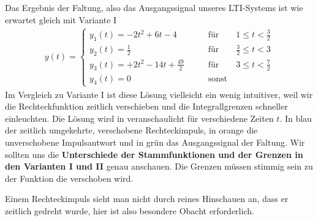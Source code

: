 \begin{Loesung}
Das Ergebnis der Faltung, also das Ausgangssignal unseres LTI-Systems ist
wie erwartet gleich mit Variante I
\begin{align}
y(t) =
\begin{cases}
  y_1(t) = -2 t^2 + 6 t - 4 &\qquad \mathrm{für} \qquad 1 \leq t < \frac{3}{2}\\
  y_2(t) = \frac{1}{2}  &\qquad \mathrm{für} \qquad \frac{3}{2} \leq t < 3\\
  y_3(t) = +2 t^2 - 14 t + \frac{49}{2} &\qquad \mathrm{für} \qquad 3 \leq t < \frac{7}{2}\\
  y_4(t)=0 &\qquad \mathrm{sonst}
\end{cases}
\end{align}
Im Vergleich zu Variante I ist diese Lösung vielleicht ein wenig
intuitiver, weil wir die Rechteckfunktion zeitlich verschieben und die
Integrallgrenzen schneller einleuchten.
%
Die Lösung wird in  veranschaulicht für verschiedene
Zeiten $t$. In blau der zeitlich umgekehrte, verschobene Rechteckimpuls, in
orange die unverschobene Impulsantwort und in grün das Ausgangssignal der Faltung.
%
Wir sollten uns die \textbf{Unterschiede der Stammfunktionen und der Grenzen in den
Varianten I und II} genau anschauen.
Die Grenzen müssen stimmig sein zu der Funktion die verschoben wird.
%

Einem Rechteckimpuls sieht man nicht durch reines Hinschauen an, dass er
zeitlich gedreht wurde, hier ist also besondere Obacht erforderlich.
%
\end{Loesung}
















